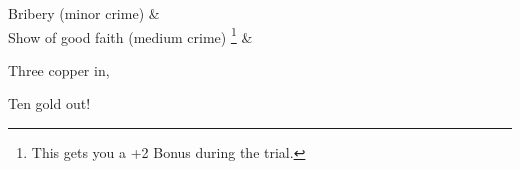 \begin{multicols}{3}
\begin{nametable}[Lc]{}
  Bribery (minor crime) &  \\

  Show of good faith (medium crime)
  \footnote{This gets you a +2 Bonus during the trial.}
  &  \\

\end{nametable}


\ifodd\value{r3}\else
  \begin{speechtext}
    \footnotesize
    Three copper in,

    Ten gold out!
  \end{speechtext}
\fi

\end{multicols}

\pagebreak

